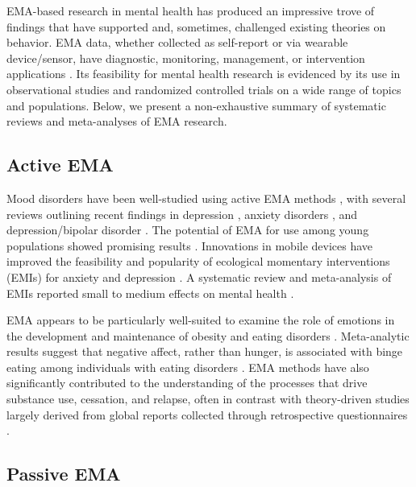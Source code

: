 \documentclass[]{book}
\begin{document}
EMA-based research in mental health has produced an impressive trove of
findings that have supported and, sometimes, challenged existing
theories on behavior. EMA data, whether collected as self-report or via
wearable device/sensor, have diagnostic, monitoring, management, or
intervention applications \citep{Patel2012, Aung2017, Evenson2015}. Its
feasibility for mental health research is evidenced by its use in
observational studies and randomized controlled trials on a wide range
of topics and populations. Below, we present a non-exhaustive summary of
systematic reviews and meta-analyses of EMA research.

\subsection{Active EMA}\label{active-ema}


Mood disorders have been well-studied using active EMA methods
\citep{Wenze2010}, with several reviews outlining recent findings in
depression \citep{Telford2012, Wichers2011, burton2013}, anxiety
disorders \citep{Walz2014}, and depression/bipolar disorder
\citep{AanhetRot2012}. The potential of EMA for use among young
populations showed promising results \citep{Dubad2018}. Innovations in
mobile devices have improved the feasibility and popularity of
ecological momentary interventions (EMIs) for anxiety and depression
\citep{schueller2017}. A systematic review and meta-analysis of EMIs
reported small to medium effects on mental health \citep{Versluis2016}.

EMA appears to be particularly well-suited to examine the role of
emotions in the development and maintenance of obesity and eating
disorders \citep{Engel2016}. Meta-analytic results suggest that negative
affect, rather than hunger, is associated with binge eating among
individuals with eating disorders \citep{Haedt2011, Haedt2012}. EMA
methods have also significantly contributed to the understanding of the
processes that drive substance use, cessation, and relapse, often in
contrast with theory-driven studies largely derived from global reports
collected through retrospective questionnaires
\citep{Shiffman2009, Swendsen2016}.

\subsection{Passive EMA}\label{passive-ema}

\end{document}
